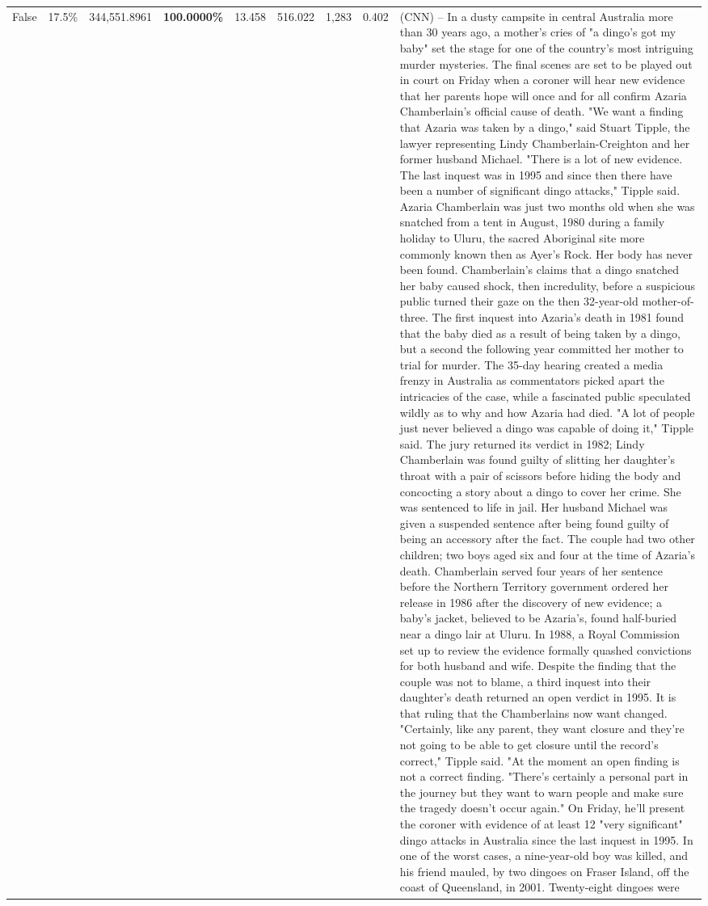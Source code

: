 \begin{table}[H]
\begin{tabular}{lllrlllll}
False & 17.5\% & 344,551.8961 & \bfseries \color{red} 100.0000\% & 13.458 & 516.022 & 1,283 & 0.402 & (CNN) -- In a dusty campsite in central Australia more than 30 years ago, a mother's cries of "a dingo's got my baby" set the stage for one of the country's most intriguing murder mysteries. The final scenes are set to be played out in court on Friday when a coroner will hear new evidence that her parents hope will once and for all confirm Azaria Chamberlain's official cause of death. "We want a finding that Azaria was taken by a dingo," said Stuart Tipple, the lawyer representing Lindy Chamberlain-Creighton and her former husband Michael. "There is a lot of new evidence. The last inquest was in 1995 and since then there have been a number of significant dingo attacks," Tipple said. Azaria Chamberlain was just two months old when she was snatched from a tent in August, 1980 during a family holiday to Uluru, the sacred Aboriginal site more commonly known then as Ayer's Rock. Her body has never been found. Chamberlain's claims that a dingo snatched her baby caused shock, then incredulity, before a suspicious public turned their gaze on the then 32-year-old mother-of-three. The first inquest into Azaria's death in 1981 found that the baby died as a result of being taken by a dingo, but a second the following year committed her mother to trial for murder. The 35-day hearing created a media frenzy in Australia as commentators picked apart the intricacies of the case, while a fascinated public speculated wildly as to why and how Azaria had died. "A lot of people just never believed a dingo was capable of doing it," Tipple said. The jury returned its verdict in 1982; Lindy Chamberlain was found guilty of slitting her daughter's throat with a pair of scissors before hiding the body and concocting a story about a dingo to cover her crime. She was sentenced to life in jail. Her husband Michael was given a suspended sentence after being found guilty of being an accessory after the fact. The couple had two other children; two boys aged six and four at the time of Azaria's death. Chamberlain served four years of her sentence before the Northern Territory government ordered her release in 1986 after the discovery of new evidence; a baby's jacket, believed to be Azaria's, found half-buried near a dingo lair at Uluru. In 1988, a Royal Commission set up to review the evidence formally quashed convictions for both husband and wife. Despite the finding that the couple was not to blame, a third inquest into their daughter's death returned an open verdict in 1995. It is that ruling that the Chamberlains now want changed. "Certainly, like any parent, they want closure and they're not going to be able to get closure until the record's correct," Tipple said. "At the moment an open finding is not a correct finding. "There's certainly a personal part in the journey but they want to warn people and make sure the tragedy doesn't occur again." On Friday, he'll present the coroner with evidence of at least 12 "very significant" dingo attacks in Australia since the last inquest in 1995. In one of the worst cases, a nine-year-old boy was killed, and his friend mauled, by two dingoes on Fraser Island, off the coast of Queensland, in 2001. Twenty-eight dingoes were 
\end{tabular}
\end{table}
